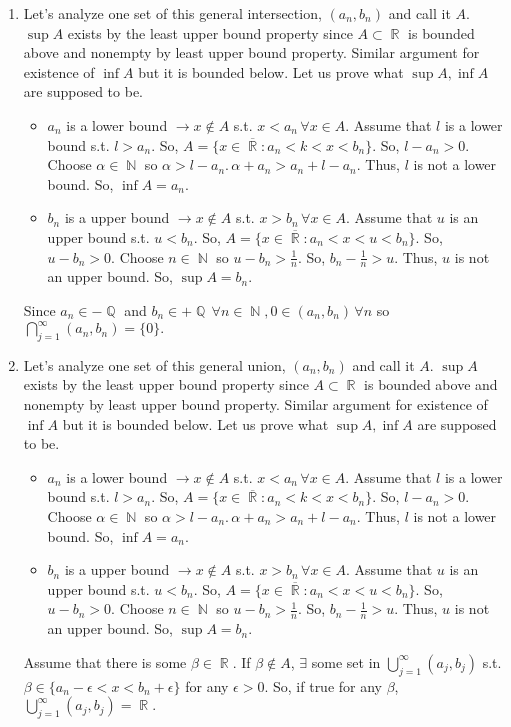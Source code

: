 \documentclass[12pt,letterpaper,boxed]{hmcpset}
\DeclareMathOperator{\R}{\mathbb{R}}
\DeclareMathOperator{\Q}{\mathbb{Q}}
\DeclareMathOperator{\N}{\mathbb{N}}
\begin{document}
\begin{solution}
\begin{enumerate}
	\item Let's analyze one set of this general intersection, $(a_n, b_n)$ and call it $A$. $\sup A$ exists by the least upper bound property since $A\subset\R$ is bounded above and nonempty by least upper bound property. Similar argument for existence of $\inf A$ but it is bounded below. Let us prove what $\sup A, \inf A$ are supposed to be.
	\vspace{-2mm}
	\begin{itemize}
		\itemsep0em
		\item $a_n$ is a lower bound $\rightarrow x \notin A$ s.t. $x < a_n \, \forall x \in A.$ Assume that $l$ is a lower bound s.t. $l > a_n.$ So, $A = \{ x \in \overline{\R} : a_n < k < x < b_n \}$. So, $l - a_n > 0$. Choose $\alpha \in \N$ so $\alpha > l - a_n.\, \alpha + a_n > a_n + l - a_n.$ Thus, $l$ is not a lower bound. So, $\inf A = a_n.$
		\item $b_n$ is a upper bound $\rightarrow x \notin A$ s.t. $x > b_n \, \forall x \in A.$ Assume that $u$ is an upper bound s.t. $u < b_n.$ So, $A = \{ x \in \overline{\R} : a_n < x < u < b_n \}$. So, $u -  b_n > 0$. Choose $n \in \N$ so $u - b_n > \frac{1}{n}.$ So, $b_n - \frac{1}{n} > u$. Thus, $u$ is not an upper bound. So, $\sup A = b_n.$
	\end{itemize}
	Since $a_n \in - \Q$ and $b_n \in +\Q \, \forall n \in \N, 0 \in (a_n, b_n) \, \forall n$ so $\bigcap_{j=1}^{\infty} (a_n,b_n)= \{0\}.$

	\item Let's analyze one set of this general union, $(a_n, b_n)$ and call it $A$. $\sup A$ exists by the least upper bound property since $A\subset\R$ is bounded above and nonempty by least upper bound property. Similar argument for existence of $\inf A$ but it is bounded below. Let us prove what $\sup A, \inf A$ are supposed to be.
	\vspace{-2mm}
	\begin{itemize}
		\itemsep0em
		\item $a_n$ is a lower bound $\rightarrow x \notin A$ s.t. $x < a_n \, \forall x \in A.$ Assume that $l$ is a lower bound s.t. $l > a_n.$ So, $A = \{ x \in \overline{\R} : a_n < k < x < b_n \}$. So, $l - a_n > 0$. Choose $\alpha \in \N$ so $\alpha > l - a_n.\, \alpha + a_n > a_n + l - a_n.$ Thus, $l$ is not a lower bound. So, $\inf A = a_n.$
		\item $b_n$ is a upper bound $\rightarrow x \notin A$ s.t. $x > b_n \, \forall x \in A.$ Assume that $u$ is an upper bound s.t. $u < b_n.$ So, $A = \{ x \in \overline{\R} : a_n < x < u < b_n \}$. So, $u -  b_n > 0$. Choose $n \in \N$ so $u - b_n > \frac{1}{n}.$ So, $b_n - \frac{1}{n} > u$. Thus, $u$ is not an upper bound. So, $\sup A = b_n.$
	\end{itemize}
	Assume that there is some $\beta \in \R$. If $\beta \notin A$, $\exists$ some set in  $\bigcup_{j=1}^{\infty}(a_j,b_j)$ s.t. $\beta \in \{ a_n - \epsilon < x < b_n + \epsilon\}$ for any $\epsilon > 0.$ So, if true for any $\beta$, $\bigcup_{j=1}^{\infty}(a_j,b_j)= \R.$
\end{enumerate}
\end{solution}
\end{document}

